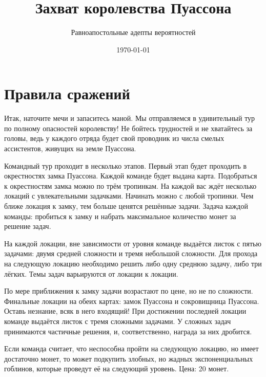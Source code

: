 \documentclass[a4paper,12pt]{article}
\author{Равноапостольные адепты вероятностей}
\title{Захват королевства Пуассона}
\date{\today}
\begin{document}

\section*{Правила сражений}

Итак, наточите мечи и запаситесь маной. Мы отправляемся в удивительный тур по полному опасностей королевству! Не бойтесь трудностей и не хватайтесь за головы, ведь у каждого отряда будет свой проводник из числа смелых ассистентов, живущих на земле Пуассона.

Командный тур проходит в несколько этапов. Первый этап будет проходить в окрестностях замка Пуассона. Каждой команде будет выдана карта. Подобраться к окрестностям замка можно по трём тропинкам. На каждой вас ждёт несколько локаций с увлекательными задачками. Начинать можно с любой тропинки. Чем ближе локация к замку, тем больше ценятся решённые задачи. Задача каждой команды: пробиться к замку и набрать максимальное количество монет за решение задач. 

 На каждой локации, вне зависимости от уровня команде выдаётся листок с пятью задачами: двумя средней сложности и тремя небольшой сложности. Для прохода на следующую локацию необходимо решить либо одну среднюю задачу, либо три лёгких.  Темы задач варьируются от локации к локации.

По мере приближения к замку задачи возрастают по цене, но не по сложности. Финальные локации на обеих картах: замок Пуассона и сокровищница Пуассона. Оставь незнание, всяк в него входящий! При достижении последней локации команде выдаётся листок с тремя сложными задачами.  У сложных задач принимаются частичные решения, и, соответственно, награда за них дробится. 


%
Если команда считает, что неспособна пройти на следующую локацию, но имеет достаточно монет, то может подкупить злобных, но жадных экспоненциальных гоблинов, которые проведут её на следующий уровень. Цена: 20 монет.
\end{document}
